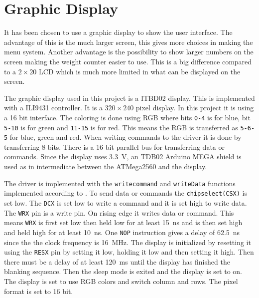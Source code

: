 \section{Graphic Display}
It has been chosen to use a graphic display to show the user interface. 
The advantage of this is the much larger screen, this gives more choices in making the menu system. 
Another advantage is the possibility  to show larger numbers on the screen making the weight counter easier to use. 
This is a big difference compared to a $2\times20$ LCD which is much more limited in what can be displayed on the screen.

The graphic display used in this project is a ITBD02 display. \cite{TJC}
This is implemented with a ILI9431 controller. \cite{ILI9413} 
It is a $320\times240$ pixel display. In this project it is using a 16 bit interface. 
The coloring is done using RGB where bits \texttt{0-4} is for blue, bit \texttt{5-10} is for green and \texttt{11-15} is for red. 
This means the RGB is transferred as \texttt{5-6-5} for blue, green and red.
When writing commands to the driver it is done by transferring 8 bits. 
There is a 16 bit parallel bus for transferring data or commands. 
Since the display uses \SI{3.3}{\volt}, an TDB02 Arduino MEGA shield is used as in intermediate between the ATMega2560 and the display.

The driver is implemented with the \texttt{writecommand} and \texttt{writeData} functions implemented according to \cite[p.~238]{ILI9413}. 
To send data or commands the \texttt{chipselect(CSX)} is set low. 
The \texttt{DCX} is set low to write a command and it is set high to write data. 
The \texttt{WRX} pin is a write pin. 
On rising edge it writes data or command. 
This means \texttt{WRX} is first set low then held low for at least \SI{15}{\nano\second} and is then set high and held high for at least \SI{10}{\nano\second}. \cite[p.~10 \& 238]{ILI9413}
One \texttt{NOP} instruction gives a delay of \SI{62.5}{\nano\second} since the the clock frequency is \SI{16}{\mega\hertz}. 
The display is initialized by resetting it using the \texttt{RESX} pin by setting it low, holding it low and then setting it high.
Then there must be a delay of at least \SI{120}{\milli\second} until the display has finished the blanking sequence. \cite[p.~230]{ILI9413}
Then the sleep mode is exited and the display is set to on.
The display is set to use RGB colors and switch column and rows. 
The pixel format is set to 16 bit.

